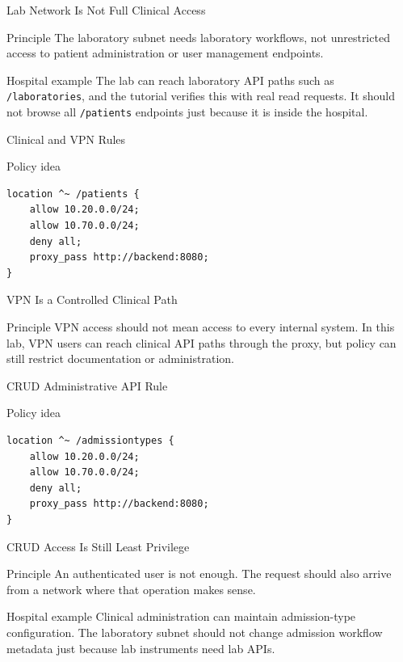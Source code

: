 \documentclass[presentation]{beamer}
\begin{document}
\begin{frame}[c]{Lab Network Is Not Full Clinical Access}
\begin{block}{Principle}
The laboratory subnet needs laboratory workflows, not unrestricted access to patient administration
or user management endpoints.
\end{block}

\begin{exampleblock}{Hospital example}
The lab can reach laboratory API paths such as \texttt{/laboratories}, and the tutorial verifies this
with real read requests. It should not browse all \texttt{/patients} endpoints just because it is
inside the hospital.
\end{exampleblock}
\end{frame}

\begin{frame}[fragile,c]{Clinical and VPN Rules}
\begin{block}{Policy idea}
\begin{verbatim}
location ^~ /patients {
    allow 10.20.0.0/24;
    allow 10.70.0.0/24;
    deny all;
    proxy_pass http://backend:8080;
}
\end{verbatim}
\end{block}
\end{frame}

\begin{frame}[c]{VPN Is a Controlled Clinical Path}
\begin{block}{Principle}
VPN access should not mean access to every internal system. In this lab, VPN users can reach
clinical API paths through the proxy, but policy can still restrict documentation or administration.
\end{block}
\end{frame}

\begin{frame}[fragile,c]{CRUD Administrative API Rule}
\begin{block}{Policy idea}
\begin{verbatim}
location ^~ /admissiontypes {
    allow 10.20.0.0/24;
    allow 10.70.0.0/24;
    deny all;
    proxy_pass http://backend:8080;
}
\end{verbatim}
\end{block}
\end{frame}

\begin{frame}[c]{CRUD Access Is Still Least Privilege}
\begin{block}{Principle}
An authenticated user is not enough. The request should also arrive from a network where that
operation makes sense.
\end{block}

\begin{exampleblock}{Hospital example}
Clinical administration can maintain admission-type configuration. The laboratory subnet should not
change admission workflow metadata just because lab instruments need lab APIs.
\end{exampleblock}
\end{frame}
\end{document}
